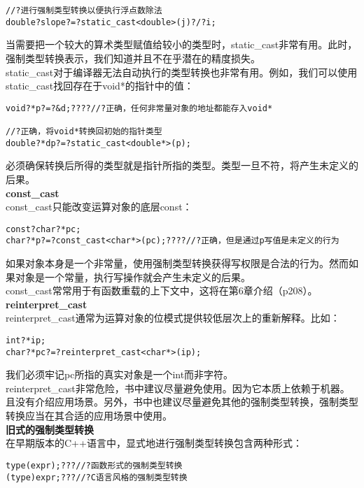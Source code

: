 \documentclass[
  a4paper,
  oneside,tablecaptionabove
]{scrbook}
\begin{document}
\begin{lstlisting}
//?进行强制类型转换以便执行浮点数除法
double?slope?=?static_cast<double>(j)?/?i;
\end{lstlisting}

当需要把一个较大的算术类型赋值给较小的类型时，static\_cast非常有用。此时，强制类型转换表示，我们知道并且不在乎潜在的精度损失。\\
static\_cast对于编译器无法自动执行的类型转换也非常有用。例如，我们可以使用static\_cast找回存在于void*的指针中的值：

\begin{lstlisting}
void?*p?=?&d;????//?正确，任何非常量对象的地址都能存入void*

//?正确，将void*转换回初始的指针类型
double?*dp?=?static_cast<double*>(p);
\end{lstlisting}

必须确保转换后所得的类型就是指针所指的类型。类型一旦不符，将产生未定义的后果。\\
\textbf{const\_cast}\\
const\_cast只能改变运算对象的底层const：

\begin{lstlisting}
const?char?*pc;
char?*p?=?const_cast<char*>(pc);????//?正确，但是通过p写值是未定义的行为
\end{lstlisting}

如果对象本身是一个非常量，使用强制类型转换获得写权限是合法的行为。然而如果对象是一个常量，执行写操作就会产生未定义的后果。\\
const\_cast常常用于有函数重载的上下文中，这将在第6章介绍（p208）。\\
\textbf{reinterpret\_cast}\\
reinterpret\_cast通常为运算对象的位模式提供较低层次上的重新解释。比如：

\begin{lstlisting}
int?*ip;
char?*pc?=?reinterpret_cast<char*>(ip);
\end{lstlisting}

我们必须牢记pc所指的真实对象是一个int而非字符。\\
reinterpret\_cast非常危险，书中建议尽量避免使用。因为它本质上依赖于机器。且没有介绍应用场景。另外，书中也建议尽量避免其他的强制类型转换，强制类型转换应当在其合适的应用场景中使用。\\
\textbf{旧式的强制类型转换}\\
在早期版本的C++语言中，显式地进行强制类型转换包含两种形式：

\begin{lstlisting}
type(expr);???//?函数形式的强制类型转换
(type)expr;???//?C语言风格的强制类型转换
\end{lstlisting}
\end{document}
